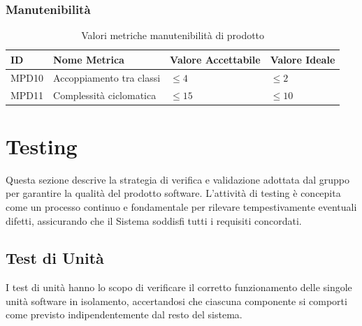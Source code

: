 \documentclass[a4paper,12pt]{article}
\begin{document}
            \subsubsection{Manutenibilità}
            \begin{longtable}{|M{1.5cm}|M{5cm}|M{2.5cm}|M{2.5cm}|}

                \caption{Valori metriche manutenibilità di prodotto} \\
                \hline
                \textbf{ID} & \textbf{Nome Metrica} & \textbf{Valore Accettabile} & \textbf{Valore Ideale} \\
                \hline
                \endhead

                    MPD10 & Accoppiamento tra classi & $\le4$ & $\le2$ \\
                    \hline

                    MPD11 & Complessità ciclomatica & $\le15$ & $\le10$ \\
                    \hline

            \end{longtable}
            
    \newpage
    \section{Testing}

    Questa sezione descrive la strategia di verifica e validazione adottata dal gruppo per garantire la qualità del prodotto software.
    L'attività di testing è concepita come un processo continuo e fondamentale per rilevare tempestivamente eventuali difetti, assicurando che il Sistema soddisfi tutti i requisiti concordati.

        \subsection{Test di Unità}

        I test di unità hanno lo scopo di verificare il corretto funzionamento delle singole unità software in isolamento, accertandosi che ciascuna componente si comporti come previsto indipendentemente dal resto del sistema.     
        
\end{document}
